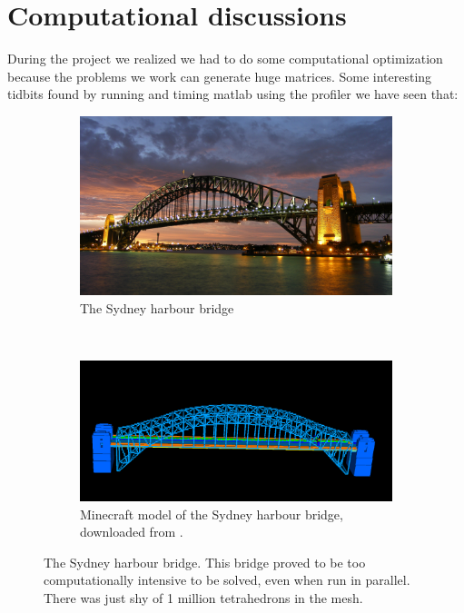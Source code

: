 \section{Computational discussions}
\label{sec:comp}

During the project we realized we had to do some computational optimization because the problems we work can generate huge matrices. Some interesting tidbits found by running and timing matlab using the profiler we have seen that:


\begin{figure}[ht]
        \centering
        \begin{subfigure}[b]{0.45 \textwidth}
                \includegraphics[width=\textwidth]{Sydney_pic}
                \caption{The Sydney harbour bridge}
        \end{subfigure}
        ~
        \begin{subfigure}[b]{0.45 \textwidth}
                \includegraphics[width=\textwidth]{sydneyBridge}
                \caption{Minecraft model of the Sydney harbour bridge, downloaded from \cite{sydneyBridge}.}
        \end{subfigure}
        \caption{The Sydney harbour bridge. This bridge proved to be too computationally intensive to be solved, even when run in parallel. There was just shy of 1 million tetrahedrons in the mesh.}
        \label{fig:sydney}
\end{figure}



